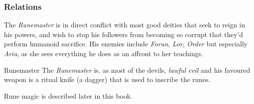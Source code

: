 \subsubsection*{Relations}

The \emph{Runemaster} is in direct conflict with most good deities that seek
to reign in his powers, and wish to stop his followers from becoming so corrupt
that they'd perform humanoid sacrifice. His enemies include \emph{Forun},
\emph{Lor}, \emph{Order} but especially \emph{Aria}, as she sees everything he
does as an affront to her teachings.

\begin{35e}{Runemaster}
  The \emph{Runemaster} is, as most of the devils, \emph{lawful evil} and his
  favoured weapon is a ritual knife (a dagger) that is used to inscribe the
  runes.

  Rune magic is described later in this book.
\end{35e}
